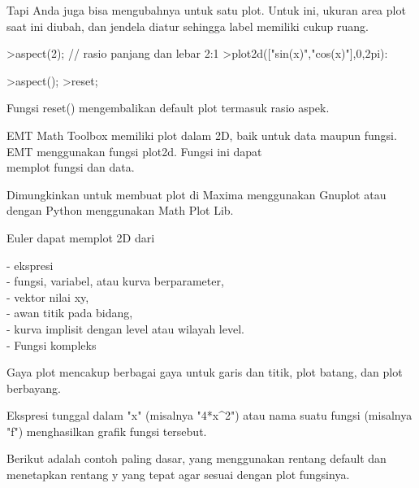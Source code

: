 \documentclass{article}
\begin{document}
\begin{eulernotebook}
\begin{eulercomment}
\begin{eulercomment}
\begin{eulercomment}
Tapi  Anda  juga  bisa  mengubahnya  untuk  satu  plot.  Untuk ini,
ukuran  area  plot  saat  ini  diubah,  dan  jendela  diatur  sehingga
label memiliki  cukup  ruang.
\end{eulercomment}
\begin{eulerprompt}
>aspect(2); // rasio panjang dan lebar 2:1
>plot2d(["sin(x)","cos(x)"],0,2pi):
\end{eulerprompt}
\begin{eulerprompt}
>aspect();
>reset;
\end{eulerprompt}
\begin{eulercomment}
Fungsi  reset()  mengembalikan  default  plot  termasuk  rasio  aspek.\\
\begin{eulercomment}
\begin{eulercomment}
EMT  Math  Toolbox  memiliki  plot  dalam  2D,  baik  untuk  data
maupun fungsi.  EMT  menggunakan  fungsi  plot2d.  Fungsi  ini  dapat\\
memplot  fungsi  dan  data.

Dimungkinkan  untuk  membuat  plot  di  Maxima  menggunakan  Gnuplot
atau  dengan  Python  menggunakan  Math  Plot  Lib.

Euler dapat memplot 2D dari

- ekspresi\\
- fungsi,  variabel,  atau  kurva  berparameter,\\
- vektor  nilai  xy,\\
- awan titik pada  bidang,\\
- kurva  implisit  dengan level  atau  wilayah  level.\\
- Fungsi kompleks

Gaya  plot  mencakup  berbagai  gaya  untuk  garis  dan  titik,  plot
batang,  dan  plot  berbayang.\\
\begin{eulercomment}
\begin{eulercomment}
Ekspresi  tunggal  dalam  "x" (misalnya  "4*x\textasciicircum{}2")  atau  nama  suatu
fungsi  (misalnya  "f")  menghasilkan  grafik  fungsi  tersebut.

Berikut  adalah  contoh  paling  dasar,  yang  menggunakan  rentang
default  dan  menetapkan  rentang  y  yang  tepat  agar  sesuai dengan
plot  fungsinya.


\end{eulercomment}
\end{eulercomment}
\end{eulercomment}
\end{eulercomment}
\end{eulercomment}
\end{eulercomment}
\end{eulercomment}
\end{eulernotebook}
\end{document}
